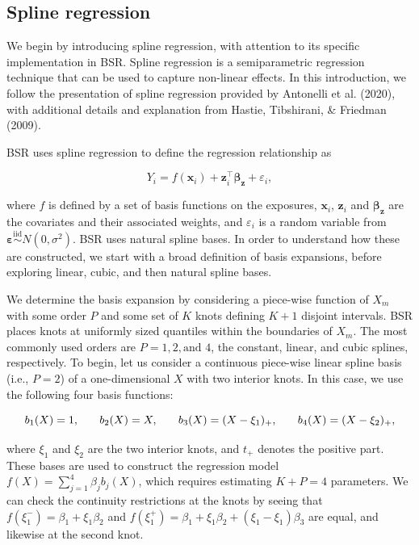 \documentclass[12pt, twoside]{amherstthesis}
\begin{document}
\hypertarget{spline-regression}{%
\subsection{Spline regression}\label{spline-regression}}

We begin by introducing spline regression, with attention to its specific implementation in BSR. Spline regression is a semiparametric regression technique that can be used to capture non-linear effects. In this introduction, we follow the presentation of spline regression provided by Antonelli et al. (2020), with additional details and explanation from Hastie, Tibshirani, \& Friedman (2009).

BSR uses spline regression to define the regression relationship as

\[
Y_i = f(\textbf{x}_i) + \textbf{z}_i^\top \boldsymbol{\beta}_{\textbf{z}} +\varepsilon_i,
\]

\noindent where \(f\) is defined by a set of basis functions on the exposures, \(\textbf{x}_i\), \(\textbf{z}_i\) and \(\boldsymbol{\beta}_{\textbf{z}}\) are the covariates and their associated weights, and \(\varepsilon_i\) is a random variable from \(\boldsymbol\varepsilon \overset{\mathrm{iid}}{\sim} N(0, \sigma^2)\). BSR uses natural spline bases. In order to understand how these are constructed, we start with a broad definition of basis expansions, before exploring linear, cubic, and then natural spline bases.

We determine the basis expansion by considering a piece-wise function of \(X_m\) with some order \(P\) and some set of \(K\) knots defining \(K+1\) disjoint intervals. BSR places knots at uniformly sized quantiles within the boundaries of \(X_m\). The most commonly used orders are \(P=1,2,\textrm{and } 4\), the constant, linear, and cubic splines, respectively. To begin, let us consider a continuous piece-wise linear spline basis (i.e., \(P=2\)) of a one-dimensional \(X\) with two interior knots. In this case, we use the following four basis functions:

\nointerlineskip

\[
b_1(X)=1, \hspace{0.25in} b_2(X)=X, \hspace{0.25in} b_3(X)=(X-\xi_1)_+, \hspace{0.25in} b_4(X)=(X-\xi_2)_+,
\]

\noindent where \(\xi_1\) and \(\xi_2\) are the two interior knots, and \(t_+\) denotes the positive part. These bases are used to construct the regression model \(f(X)=\sum_{j=1}^4\beta_jb_j(X)\), which requires estimating \(K+P=4\) parameters. We can check the continuity restrictions at the knots by seeing that \(f(\xi_1^-)=\beta_1 + \xi_1\beta_2\) and \(f(\xi_1^+)= \beta_1 + \xi_1\beta_2+ (\xi_1-\xi_1)\beta_3\) are equal, and likewise at the second knot.
\end{document}
